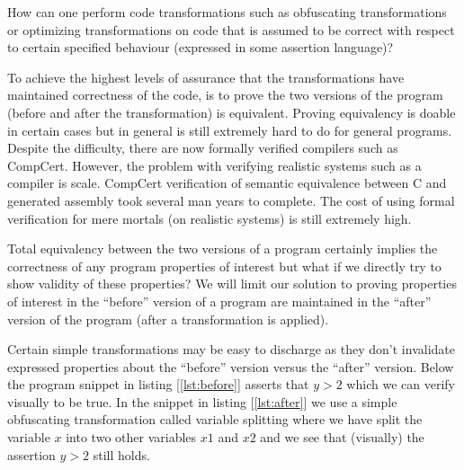\documentclass[compsoc,conference,a4paper,10pt,times]{IEEEtran}
\begin{document}
How can one perform code transformations such as obfuscating transformations or optimizing transformations on code that is assumed to be correct with respect to certain specified behaviour (expressed in some assertion language)? 

To achieve the highest levels of assurance that the transformations have maintained correctness of the code, is to prove the two versions of the program (before and after the transformation) is equivalent. Proving equivalency is doable in certain cases but in general is still extremely hard to do for general programs. Despite the difficulty, there are now formally verified compilers such as CompCert. However, the problem with verifying realistic systems such as a compiler is scale. CompCert verification of semantic equivalence between C and generated assembly took several man years to complete. The cost of using formal verification for mere mortals (on realistic systems) is still extremely high. 


Total equivalency between the two versions of a program certainly implies the correctness of any program properties of interest but what if we directly try to show validity of these properties? We will limit our solution to proving properties of interest in the ``before'' version of a program are maintained in the ``after'' version of the program (after a transformation is applied). 

Certain simple transformations may be easy to discharge as they don't invalidate expressed properties about the ``before'' version versus the ``after'' version. Below the program snippet in listing [\ref{lst:before}] asserts that $y > 2$ which we can verify visually to be true. In the snippet in listing [\ref{lst:after}] we use a simple obfuscating transformation called variable splitting where we have split the variable $x$ into two other variables $x1$ and $x2$ and we see that (visually) the assertion $y > 2$ still holds.



\end{document}
